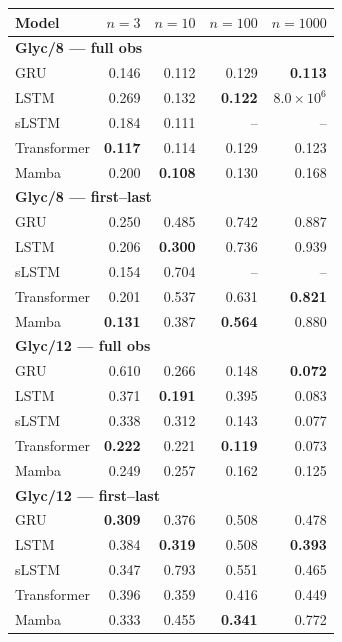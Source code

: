 \begin{tabular*}{\linewidth}{@{\extracolsep{\fill}}lrrrr}
\toprule
Model & $n=3$ & $n=10$ & $n=100$ & $n=1000$ \\
\midrule
\multicolumn{5}{l}{\textbf{Glyc/8 — full obs}} \\
GRU & 0.146 & 0.112 & 0.129 & \textbf{0.113} \\
LSTM & 0.269 & 0.132 & \textbf{0.122} & $8.0\!\times\!10^{6}$ \\
sLSTM & 0.184 & 0.111 & -- & -- \\
Transformer & \textbf{0.117} & 0.114 & 0.129 & 0.123 \\
Mamba & 0.200 & \textbf{0.108} & 0.130 & 0.168 \\
\midrule
\multicolumn{5}{l}{\textbf{Glyc/8 — first--last}} \\
GRU & 0.250 & 0.485 & 0.742 & 0.887 \\
LSTM & 0.206 & \textbf{0.300} & 0.736 & 0.939 \\
sLSTM & 0.154 & 0.704 & -- & -- \\
Transformer & 0.201 & 0.537 & 0.631 & \textbf{0.821} \\
Mamba & \textbf{0.131} & 0.387 & \textbf{0.564} & 0.880 \\
\midrule
\multicolumn{5}{l}{\textbf{Glyc/12 — full obs}} \\
GRU & 0.610 & 0.266 & 0.148 & \textbf{0.072} \\
LSTM & 0.371 & \textbf{0.191} & 0.395 & 0.083 \\
sLSTM & 0.338 & 0.312 & 0.143 & 0.077 \\
Transformer & \textbf{0.222} & 0.221 & \textbf{0.119} & 0.073 \\
Mamba & 0.249 & 0.257 & 0.162 & 0.125 \\
\midrule
\multicolumn{5}{l}{\textbf{Glyc/12 — first--last}} \\
GRU & \textbf{0.309} & 0.376 & 0.508 & 0.478 \\
LSTM & 0.384 & \textbf{0.319} & 0.508 & \textbf{0.393} \\
sLSTM & 0.347 & 0.793 & 0.551 & 0.465 \\
Transformer & 0.396 & 0.359 & 0.416 & 0.449 \\
Mamba & 0.333 & 0.455 & \textbf{0.341} & 0.772 \\
\bottomrule
\end{tabular*}
